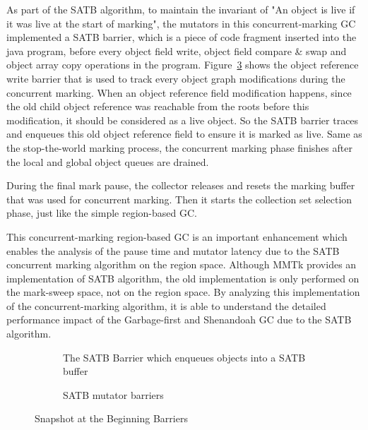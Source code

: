As part of the SATB algorithm, to maintain the invariant of "An object is live if it was live at the start of marking",
the mutators in this concurrent-marking GC implemented a SATB barrier, which is a piece of code
fragment inserted into the java program, before every object field write, object field compare \& swap
and object array copy operations in the program.
Figure~\ref{fig:satbbarrier} shows the object reference write barrier that is used
to track every object graph modifications during the concurrent marking.
When an object reference field modification happens, since the old child object reference
was reachable from the roots before this modification, it should be considered as a live object.
So the SATB barrier traces and enqueues this old object reference field to ensure it is marked as live.
Same as the stop-the-world marking process, the concurrent marking phase finishes after
the local and global object queues are drained.

During the final mark pause, the collector releases and resets the marking buffer that
was used for concurrent marking. Then it starts the collection set selection phase, just like the
simple region-based GC.

This concurrent-marking region-based GC is an important enhancement which enables
the analysis of the pause time and mutator latency due to the SATB concurrent marking algorithm on the region space.
Although MMTk provides an implementation of SATB algorithm, the old implementation
is only performed on the mark-sweep space, not on the region space.
By analyzing this implementation of the concurrent-marking algorithm,
it is able to understand the detailed performance impact of the Garbage-first and Shenandoah GC due to the SATB algorithm.

\begin{figure}
  \centering
  \begin{subfigure}[a]{\textwidth}
    
    \caption{The SATB Barrier which enqueues objects into a SATB buffer}
    \label{fig:satb:enqueue}
  \end{subfigure}

  \begin{subfigure}[b]{\textwidth}
    
    \caption{SATB mutator barriers}
    \label{fig:satb:ofw}
  \end{subfigure}

  \caption{Snapshot at the Beginning Barriers}
  \label{fig:satbbarrier}
\end{figure}

